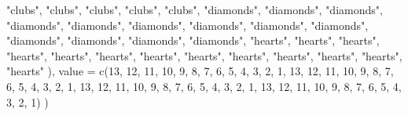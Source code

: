 \documentclass[
]{memoir}
\newenvironment{Shaded}{\begin{snugshade}}{\end{snugshade}}
\newcommand{\AttributeTok}[1]{\textcolor[rgb]{0.77,0.63,0.00}{#1}}
\newcommand{\DecValTok}[1]{\textcolor[rgb]{0.00,0.00,0.81}{#1}}
\newcommand{\FunctionTok}[1]{\textcolor[rgb]{0.00,0.00,0.00}{#1}}
\newcommand{\NormalTok}[1]{#1}
\newcommand{\StringTok}[1]{\textcolor[rgb]{0.31,0.60,0.02}{#1}}
\theoremstyle{definition}
\theoremstyle{definition}
\theoremstyle{definition}
\theoremstyle{definition}
\theoremstyle{remark}
\begin{document}
\begin{Shaded}
\begin{Highlighting}[]
    \StringTok{"clubs"}\NormalTok{, }\StringTok{"clubs"}\NormalTok{, }\StringTok{"clubs"}\NormalTok{, }\StringTok{"clubs"}\NormalTok{, }\StringTok{"clubs"}\NormalTok{, }\StringTok{"diamonds"}\NormalTok{,}
    \StringTok{"diamonds"}\NormalTok{, }\StringTok{"diamonds"}\NormalTok{, }\StringTok{"diamonds"}\NormalTok{, }\StringTok{"diamonds"}\NormalTok{,}
    \StringTok{"diamonds"}\NormalTok{, }\StringTok{"diamonds"}\NormalTok{, }\StringTok{"diamonds"}\NormalTok{, }\StringTok{"diamonds"}\NormalTok{,}
    \StringTok{"diamonds"}\NormalTok{, }\StringTok{"diamonds"}\NormalTok{, }\StringTok{"diamonds"}\NormalTok{, }\StringTok{"diamonds"}\NormalTok{, }\StringTok{"hearts"}\NormalTok{,}
    \StringTok{"hearts"}\NormalTok{, }\StringTok{"hearts"}\NormalTok{, }\StringTok{"hearts"}\NormalTok{, }\StringTok{"hearts"}\NormalTok{, }\StringTok{"hearts"}\NormalTok{,}
    \StringTok{"hearts"}\NormalTok{, }\StringTok{"hearts"}\NormalTok{, }\StringTok{"hearts"}\NormalTok{, }\StringTok{"hearts"}\NormalTok{, }\StringTok{"hearts"}\NormalTok{,}
    \StringTok{"hearts"}\NormalTok{, }\StringTok{"hearts"}
\NormalTok{  ),}
  \AttributeTok{value =} \FunctionTok{c}\NormalTok{(}\DecValTok{13}\NormalTok{, }\DecValTok{12}\NormalTok{, }\DecValTok{11}\NormalTok{, }\DecValTok{10}\NormalTok{, }\DecValTok{9}\NormalTok{, }\DecValTok{8}\NormalTok{, }\DecValTok{7}\NormalTok{, }\DecValTok{6}\NormalTok{, }\DecValTok{5}\NormalTok{, }\DecValTok{4}\NormalTok{, }\DecValTok{3}\NormalTok{, }\DecValTok{2}\NormalTok{, }\DecValTok{1}\NormalTok{, }\DecValTok{13}\NormalTok{, }\DecValTok{12}\NormalTok{, }\DecValTok{11}\NormalTok{, }\DecValTok{10}\NormalTok{, }\DecValTok{9}\NormalTok{, }\DecValTok{8}\NormalTok{, }\DecValTok{7}\NormalTok{, }\DecValTok{6}\NormalTok{, }\DecValTok{5}\NormalTok{, }\DecValTok{4}\NormalTok{, }\DecValTok{3}\NormalTok{, }\DecValTok{2}\NormalTok{, }\DecValTok{1}\NormalTok{, }\DecValTok{13}\NormalTok{, }\DecValTok{12}\NormalTok{, }\DecValTok{11}\NormalTok{, }\DecValTok{10}\NormalTok{, }\DecValTok{9}\NormalTok{, }\DecValTok{8}\NormalTok{, }\DecValTok{7}\NormalTok{, }\DecValTok{6}\NormalTok{, }\DecValTok{5}\NormalTok{, }\DecValTok{4}\NormalTok{, }\DecValTok{3}\NormalTok{, }\DecValTok{2}\NormalTok{, }\DecValTok{1}\NormalTok{, }\DecValTok{13}\NormalTok{, }\DecValTok{12}\NormalTok{, }\DecValTok{11}\NormalTok{, }\DecValTok{10}\NormalTok{, }\DecValTok{9}\NormalTok{, }\DecValTok{8}\NormalTok{, }\DecValTok{7}\NormalTok{, }\DecValTok{6}\NormalTok{, }\DecValTok{5}\NormalTok{, }\DecValTok{4}\NormalTok{, }\DecValTok{3}\NormalTok{, }\DecValTok{2}\NormalTok{, }\DecValTok{1}\NormalTok{)}
\NormalTok{)}
\end{Highlighting}
\end{Shaded}
\end{document}
